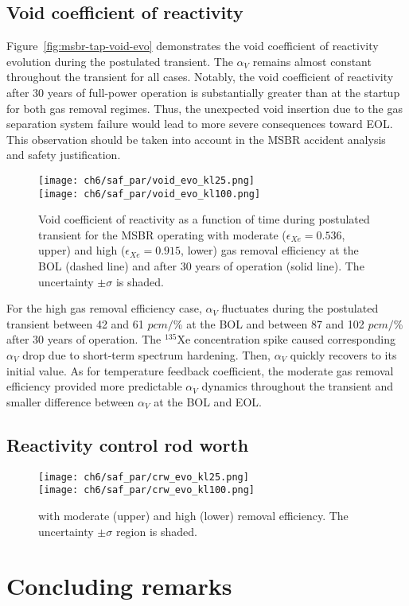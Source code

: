 \subsection{Void coefficient of reactivity}
Figure~\ref{fig:msbr-tap-void-evo} demonstrates the void coefficient of 
reactivity evolution during the postulated transient. 
The $\alpha_V$ remains almost constant throughout the transient for all cases. 
Notably, the void coefficient of reactivity after 30 years of full-power 
operation is substantially greater than at the startup for both gas removal 
regimes. Thus, the unexpected void insertion due to the gas separation system 
failure would lead to more severe consequences toward \gls{EOL}. This 
observation should be taken into account in the \gls{MSBR} accident analysis 
and safety
justification.
\begin{figure}[htbp!] %
	\centering
	\texttt{[image: ch6/saf\_par/void\_evo\_kl25.png]}\\
	\vspace{-12mm}
	\hspace{+0.05mm}
	\texttt{[image: ch6/saf\_par/void\_evo\_kl100.png]}
	\vspace{-3mm}
	\caption{Void coefficient of reactivity as a function of time during 
	postulated transient
for the \gls{MSBR} operating with moderate 
	($\epsilon_{Xe}=0.536$, upper) and high ($\epsilon_{Xe}=0.915$, lower) gas 
	removal efficiency at the \gls{BOL} (dashed line) and after 30 years of 
	operation (solid line). The uncertainty $\pm\sigma$ is shaded.}
	\label{fig:msbr-lf-void-evo}
\end{figure}

For the high gas removal efficiency case, $\alpha_V$ fluctuates during the 
postulated transient between 42 and 61 $pcm/$\% at the \gls{BOL} and between 
87 and 102 $pcm/$\% after 30 years of operation. The $^{135}$Xe concentration 
spike caused corresponding $\alpha_V$ drop due to short-term spectrum 
hardening. Then, $\alpha_V$ quickly recovers to its initial value. As for 
temperature feedback coefficient, the moderate gas removal efficiency provided 
more predictable $\alpha_V$ dynamics throughout the transient and smaller 
difference between $\alpha_V$ at the \gls{BOL} and \gls{EOL}.

\subsection{Reactivity control rod worth}
\begin{figure}[htbp!] %
	\centering
	\texttt{[image: ch6/saf\_par/crw\_evo\_kl25.png]}\\
	\vspace{-10mm}
	\hspace{+0.05mm}
	\texttt{[image: ch6/saf\_par/crw\_evo\_kl100.png]}
	\vspace{-3mm}
	\caption{with moderate (upper) and high (lower) removal efficiency. The 
		uncertainty $\pm\sigma$ region is shaded.}
	\label{fig:msbr-lf-crw-evo}
\end{figure}

\section{Concluding remarks}